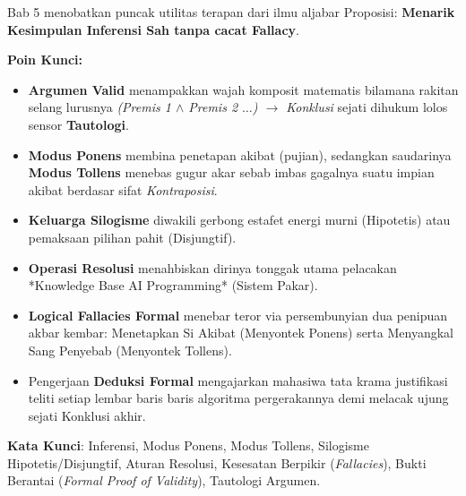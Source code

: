 \documentclass[../main]{subfiles}
\begin{document}
\begin{rangkuman}
Bab 5 menobatkan puncak utilitas terapan dari ilmu aljabar Proposisi: \textbf{Menarik Kesimpulan Inferensi Sah tanpa cacat Fallacy}.

\textbf{Poin Kunci:}
\begin{itemize}
  \item \textbf{Argumen Valid} menampakkan wajah komposit matematis bilamana rakitan selang lurusnya \textit{(Premis 1 $\land$ Premis 2 $\ldots$) $\rightarrow$ Konklusi} sejati dihukum lolos sensor \textbf{Tautologi}.
  \item \textbf{Modus Ponens} membina penetapan akibat (pujian), sedangkan saudarinya \textbf{Modus Tollens} menebas gugur akar sebab imbas gagalnya suatu impian akibat berdasar sifat \textit{Kontraposisi}.
  \item \textbf{Keluarga Silogisme} diwakili gerbong estafet energi murni (Hipotetis) atau pemaksaan pilihan pahit (Disjungtif).
  \item \textbf{Operasi Resolusi} menahbiskan dirinya tonggak utama pelacakan *Knowledge Base AI Programming* (Sistem Pakar).
  \item \textbf{Logical Fallacies Formal} menebar teror via persembunyian dua penipuan akbar kembar: Menetapkan Si Akibat (Menyontek Ponens) serta Menyangkal Sang Penyebab (Menyontek Tollens).
  \item Pengerjaan \textbf{Deduksi Formal} mengajarkan mahasiwa tata krama justifikasi teliti setiap lembar baris baris algoritma pergerakannya demi melacak ujung sejati Konklusi akhir.
\end{itemize}

\textbf{Kata Kunci}: Inferensi, Modus Ponens, Modus Tollens, Silogisme Hipotetis/Disjungtif, Aturan Resolusi, Kesesatan Berpikir (\textit{Fallacies}), Bukti Berantai (\textit{Formal Proof of Validity}), Tautologi Argumen.
\end{rangkuman}

\ifSubfilesClassLoaded{
  \renewcommand{\bibname}{Daftar Pustaka}
  
  
}{}
\end{document}
